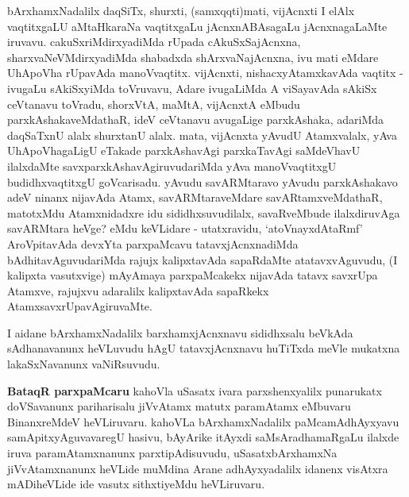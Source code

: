 \begin{artha}
bArxhamxNadalilx daqSiTx, shurxti, (samxqqti)mati, vijAcnxti I elAlx vaqtitxgaLU aMtaHkaraNa vaqtitxgaLu jAcnxnABAsagaLu jAcnxnagaLaMte iruvavu. cakuSxriMdirxyadiMda rUpada cAkuSxSajAcnxna, sharxvaNeVMdirxyadiMda shabadxda shArxvaNajAcnxna, ivu mati eMdare UhApoVha rUpavAda manoVvaqtitx. vijAcnxti, nishacxyAtamxkavAda vaqtitx - ivugaLu sAkiSxyiMda toVruvavu, Adare ivugaLiMda A viSayavAda sAkiSx ceVtanavu toVradu, shorxVtA, maMtA, vijAcnxtA eMbudu parxkAshakaveMdathaR, ideV ceVtanavu avugaLige parxkAshaka, adariMda daqSaTxnU alalx shurxtanU alalx. mata, vijAcnxta yAvudU Atamxvalalx, yAva UhApoVhagaLigU eTakade parxkAshavAgi parxkaTavAgi saMdeVhavU ilalxdaMte savxparxkAshavAgiruvudariMda yAva manoVvaqtitxgU budidhxvaqtitxgU goVcarisadu. yAvudu savARMtaravo yAvudu parxkAshakavo adeV ninanx nijavAda Atamx, savARMtaraveMdare savARtamxveMdathaR, matotxMdu Atamxnidadxre idu sididhxsuvudilalx, savaRveMbude ilalxdiruvAga savARMtara heVge? eMdu keVLidare - utatxravidu, `atoV\s nayxdAtaRmf' AroVpitavAda devxYta parxpaMcavu tatavxjAcnxnadiMda bAdhitavAguvudariMda rajujx kalipxtavAda sapaRdaMte atatavxvAguvudu, (I kalipxta vasutxvige) mAyAmaya parxpaMcakekx nijavAda tatavx savxrUpa Atamxve, rajujxvu adaralilx kalipxtavAda sapaRkekx AtamxsavxrUpavAgiruvaMte. 
\end{artha}


\begin{artha}
I aidane bArxhamxNadalilx barxhamxjAcnxnavu sididhxsalu beVkAda sAdhanavanunx heVLuvudu hAgU tatavxjAcnxnavu huTiTxda meVle mukatxna lakaSxNavanunx vaNiRsuvudu.
\end{artha}


\begin{artha}
{\bf BataqR parxpaMcaru} kahoVla uSasatx ivara parxshenxyalilx punarukatx doVSavanunx pariharisalu jiVvAtamx matutx paramAtamx eMbuvaru BinanxreMdeV heVLiruvaru. kahoVLa bArxhamxNadalilx paMcamAdhAyxyavu samApitxyAguvavaregU hasivu,  bAyArike itAyxdi saMsAradhamaRgaLu ilalxde iruva paramAtamxnanunx parxtipAdisuvudu, uSasatxbArxhamxNa jiVvAtamxnanunx heVLide muMdina Arane adhAyxyadalilx idanenx visAtxra mADiheVLide ide vasutx sithxtiyeMdu heVLiruvaru.
\end{artha}


